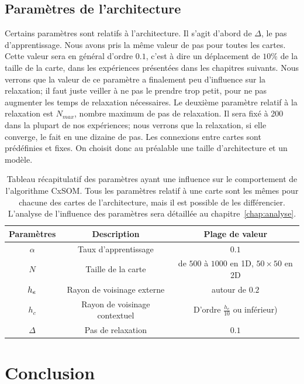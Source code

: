 \subsection{Paramètres de l'architecture}
Certains paramètres sont relatifs à l'architecture. Il s'agit d'abord de $\Delta$, le pas d'apprentissage. Nous avons pris la même valeur de pas pour toutes les cartes. Cette valeur sera en général d'ordre $0.1$, c'est à dire un déplacement de $10\%$ de la taille de la carte, dans les expériences présentées dans les chapitres suivants. Nous verrons que la valeur de ce paramètre a finalement peu d'influence sur la relaxation; il faut juste veiller à ne pas le prendre trop petit, pour ne pas augmenter les temps de relaxation nécessaires. Le deuxième paramètre relatif à la relaxation est $N_{max}$, nombre maximum de pas de relaxation. Il sera fixé à 200 dans la plupart de nos expériences; nous verrons que la relaxation, si elle converge, le fait en une dizaine de pas.
Les connexions entre cartes sont prédéfinies et fixes. On choisit donc au préalable une taille d'architecture et un modèle. 

\begin{table}
\caption{Tableau récapitulatif des paramètres ayant une influence sur le comportement de l'algorithme CxSOM. Tous les paramètres relatif à une carte sont les mêmes pour chacune des cartes de l'architecture, mais il est possible de les différencier. L'analyse de l'influence des paramètres sera détaillée au chapitre~\ref{chap:analyse}.}\label{tab:params}
\vspace{3mm}
\begin{tabular}{|c|c|c|}
\hline
Paramètres & Description & Plage de valeur \\
\hline
$\alpha$ & Taux d'apprentissage & $0.1$ \\
$N$ & Taille de la carte & de $500$ à $1000$ en 1D, $50 \times 50$ en 2D \\
$h_e$ & Rayon de voisinage externe & autour de $0.2$ \\
$h_c$ & Rayon de voisinage contextuel & D'ordre $\frac{h_e}{10}$ ou inférieur) \\
$\Delta$ & Pas de relaxation & $0.1$ \\
\hline
\end{tabular}
\end{table}


\section{Conclusion}

